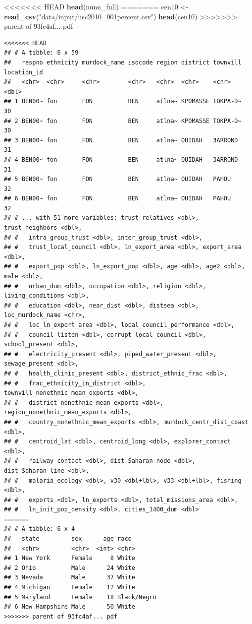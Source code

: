 \documentclass[]{book}
\newenvironment{Shaded}{\begin{snugshade}}{\end{snugshade}}
\newcommand{\KeywordTok}[1]{\textcolor[rgb]{0.13,0.29,0.53}{\textbf{#1}}}
\newcommand{\NormalTok}[1]{#1}
\newcommand{\StringTok}[1]{\textcolor[rgb]{0.31,0.60,0.02}{#1}}
\theoremstyle{definition}
\theoremstyle{definition}
\theoremstyle{definition}
\theoremstyle{remark}
\begin{document}
\begin{Shaded}
\begin{Highlighting}[]
<<<<<<< HEAD
\KeywordTok{head}\NormalTok{(nunn\_full)}
=======
\NormalTok{cen10 <-}\StringTok{ }\KeywordTok{read_csv}\NormalTok{(}\StringTok{"data/input/usc2010_001percent.csv"}\NormalTok{)}
\KeywordTok{head}\NormalTok{(cen10)}
>>>>>>> parent of 93fc4af... pdf
\end{Highlighting}
\end{Shaded}

\begin{verbatim}
<<<<<<< HEAD
## # A tibble: 6 x 59
##   respno ethnicity murdock_name isocode region district townvill location_id
##   <chr>  <chr>     <chr>        <chr>   <chr>  <chr>    <chr>          <dbl>
## 1 BEN00~ fon       FON          BEN     atlna~ KPOMASSE TOKPA-D~          30
## 2 BEN00~ fon       FON          BEN     atlna~ KPOMASSE TOKPA-D~          30
## 3 BEN00~ fon       FON          BEN     atlna~ OUIDAH   3ARROND           31
## 4 BEN00~ fon       FON          BEN     atlna~ OUIDAH   3ARROND           31
## 5 BEN00~ fon       FON          BEN     atlna~ OUIDAH   PAHOU             32
## 6 BEN00~ fon       FON          BEN     atlna~ OUIDAH   PAHOU             32
## # ... with 51 more variables: trust_relatives <dbl>, trust_neighbors <dbl>,
## #   intra_group_trust <dbl>, inter_group_trust <dbl>,
## #   trust_local_council <dbl>, ln_export_area <dbl>, export_area <dbl>,
## #   export_pop <dbl>, ln_export_pop <dbl>, age <dbl>, age2 <dbl>, male <dbl>,
## #   urban_dum <dbl>, occupation <dbl>, religion <dbl>, living_conditions <dbl>,
## #   education <dbl>, near_dist <dbl>, distsea <dbl>, loc_murdock_name <chr>,
## #   loc_ln_export_area <dbl>, local_council_performance <dbl>,
## #   council_listen <dbl>, corrupt_local_council <dbl>, school_present <dbl>,
## #   electricity_present <dbl>, piped_water_present <dbl>, sewage_present <dbl>,
## #   health_clinic_present <dbl>, district_ethnic_frac <dbl>,
## #   frac_ethnicity_in_district <dbl>, townvill_nonethnic_mean_exports <dbl>,
## #   district_nonethnic_mean_exports <dbl>, region_nonethnic_mean_exports <dbl>,
## #   country_nonethnic_mean_exports <dbl>, murdock_centr_dist_coast <dbl>,
## #   centroid_lat <dbl>, centroid_long <dbl>, explorer_contact <dbl>,
## #   railway_contact <dbl>, dist_Saharan_node <dbl>, dist_Saharan_line <dbl>,
## #   malaria_ecology <dbl>, v30 <dbl+lbl>, v33 <dbl+lbl>, fishing <dbl>,
## #   exports <dbl>, ln_exports <dbl>, total_missions_area <dbl>,
## #   ln_init_pop_density <dbl>, cities_1400_dum <dbl>
=======
## # A tibble: 6 x 4
##   state         sex      age race       
##   <chr>         <chr>  <int> <chr>      
## 1 New York      Female     8 White      
## 2 Ohio          Male      24 White      
## 3 Nevada        Male      37 White      
## 4 Michigan      Female    12 White      
## 5 Maryland      Female    18 Black/Negro
## 6 New Hampshire Male      50 White
>>>>>>> parent of 93fc4af... pdf
\end{verbatim}
\end{document}
